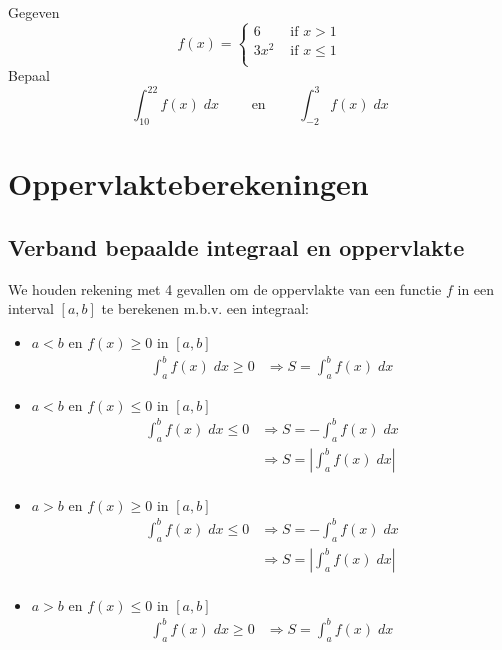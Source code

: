 \documentclass[a4paper,12pt, twoside]{article}
\begin{document}
\begin{oefening} %
Gegeven
$$f(x)=\begin{cases}6 & \mbox{ if } x > 1\\3x^2 & \mbox{ if } x \leq 1\\\end{cases}$$
Bepaal
$$\displaystyle \int_{10}^{22} f(x) \;dx \qquad\mbox{ en }\qquad \displaystyle \int_{-2}^{3} f(x) \;dx$$
\end{oefening}

\cleardoublepage
\section{Oppervlakteberekeningen}

\subsection{Verband bepaalde integraal en oppervlakte}

We houden rekening met 4 gevallen om de oppervlakte van een functie $f$ in een interval $[a,b]$ te berekenen m.b.v. een integraal:
\begin{itemize}
  \item $a<b$ en $f(x)\geq0$ in $[a,b]$
  \begin{align*}
    \int_a^b f(x)\; dx \geq 0 &\Rightarrow S=\int_a^b f(x)\; dx
  \end{align*}
  \item $a<b$ en $f(x)\leq0$ in $[a,b]$
  \begin{align*}
    \int_a^b f(x)\; dx \leq 0 &\Rightarrow S=-\int_a^b f(x)\; dx\\
                              &\Rightarrow S=|\int_a^b f(x)\; dx|\\
  \end{align*}
  \item $a>b$ en $f(x)\geq0$ in $[a,b]$
  \begin{align*}
    \int_a^b f(x)\; dx \leq 0 &\Rightarrow S=-\int_a^b f(x)\; dx\\
                              &\Rightarrow S=|\int_a^b f(x)\; dx|\\
  \end{align*}
  \item $a>b$ en $f(x)\leq0$ in $[a,b]$
  \begin{align*}
    \int_a^b f(x)\; dx \geq 0 &\Rightarrow S=\int_a^b f(x)\; dx
  \end{align*}
\end{itemize}
\end{document}
